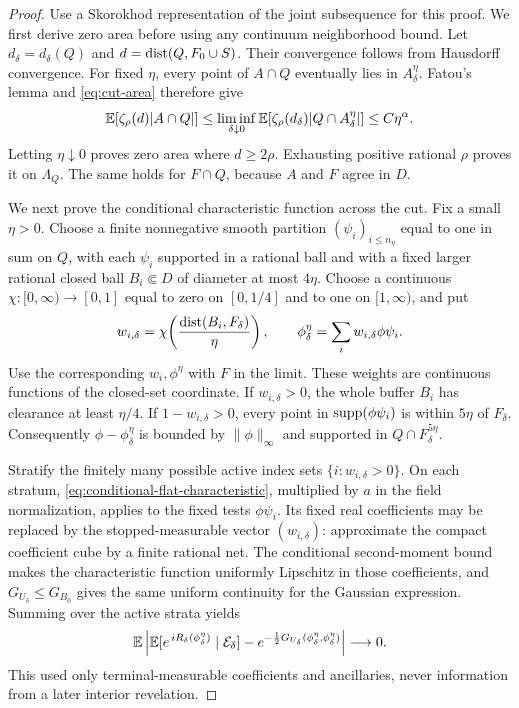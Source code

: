 \begin{proof}
Use a Skorokhod representation of the joint subsequence for this proof.
We first derive zero area before using any continuum neighborhood bound.
Let \(d_\delta=d_\delta(Q)\) and \(d=\operatorname{dist}(Q,F_0\cup S)\).
Their convergence follows from Hausdorff convergence. For fixed \(\eta\),
every point of \(A\cap Q\) eventually lies in \(A_\delta^\eta\).
Fatou's lemma and \eqref{eq:cut-area} therefore give
\[
 \mathbb E[\zeta_\rho(d)|A\cap Q|]
 \le \liminf_{\delta\downarrow0}
       \mathbb E[\zeta_\rho(d_\delta)|Q\cap A_\delta^\eta|]
 \le C\eta^\alpha.
\]
Letting \(\eta\downarrow0\) proves zero area where \(d\ge2\rho\).
Exhausting positive rational \(\rho\) proves it on \(\Lambda_Q\).
The same holds for \(F\cap Q\), because \(A\) and \(F\) agree in \(D\).

We next prove the conditional characteristic function across the cut.
Fix a small \(\eta>0\). Choose a finite nonnegative smooth partition
\((\psi_i)_{i\le n_\eta}\) equal to one in sum on \(Q\), with each
\(\psi_i\) supported in a rational ball and with a fixed larger rational
closed ball \(B_i\Subset D\) of diameter at most \(4\eta\). Choose a continuous
\(\chi:[0,\infty)\to[0,1]\) equal to zero on \([0,1/4]\) and to one on
\([1,\infty)\), and put
\begin{equation}
 w_{i,\delta}=\chi\!\left(\frac{\operatorname{dist}(B_i,F_\delta)}{\eta}\right),
 \qquad
 \phi_\delta^\eta=\sum_i w_{i,\delta}\phi\psi_i.
 \label{eq:stopped-partition}
\end{equation}
Use the corresponding \(w_i,\phi^\eta\) with \(F\) in the limit.
These weights are continuous functions of the closed-set coordinate.
If \(w_{i,\delta}>0\), the whole buffer \(B_i\) has clearance at least
\(\eta/4\). If \(1-w_{i,\delta}>0\), every point in
\(\operatorname{supp}(\phi\psi_i)\) is within \(5\eta\) of \(F_\delta\). Consequently
\(\phi-\phi_\delta^\eta\) is bounded by \(\|\phi\|_\infty\) and
supported in \(Q\cap F_\delta^{5\eta}\).

Stratify the finitely many possible active index sets
\(\{i:w_{i,\delta}>0\}\). On each stratum,
\cref{eq:conditional-flat-characteristic}, multiplied by \(a\) in the
field normalization, applies to the fixed tests \(\phi\psi_i\).
Its fixed real coefficients may be replaced by the stopped-measurable
vector \((w_{i,\delta})\): approximate the compact coefficient cube
by a finite rational net. The conditional second-moment bound makes
the characteristic function uniformly Lipschitz in those coefficients,
and \(G_{U_\delta}\le G_{B_0}\) gives the same uniform continuity for
the Gaussian expression. Summing over the active strata yields
\begin{equation}
 \mathbb E\left|
 \mathbb E[e^{\,iR_\delta(\phi_\delta^\eta)}\mid\mathcal E_\delta]
       -e^{-\frac12G_{U_\delta}(\phi_\delta^\eta,\phi_\delta^\eta)}
       \right|\longrightarrow0.
 \label{eq:stopped-buffer-characteristic}
\end{equation}
This used only terminal-measurable coefficients and ancillaries, never
information from a later interior revelation.


\end{proof}

